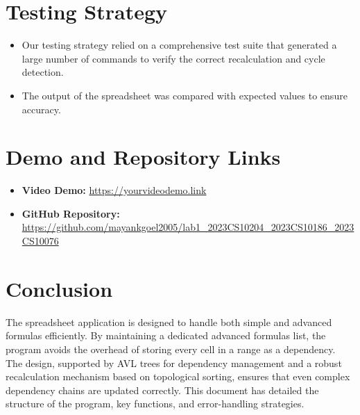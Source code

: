 \documentclass[12pt]{article}
\begin{document}
\section{Testing Strategy}
\begin{itemize}[noitemsep]
    \item Our testing strategy relied on a comprehensive test suite that generated a large number of commands to verify the correct recalculation and cycle detection.
    \item The output of the spreadsheet was compared with expected values to ensure accuracy.
\end{itemize}

\section{Demo and Repository Links}
\begin{itemize}[noitemsep]
    \item \textbf{Video Demo:} \url{https://yourvideodemo.link}
    \item \textbf{GitHub Repository:} \url{https://github.com/mayankgoel2005/lab1_2023CS10204_2023CS10186_2023CS10076}
\end{itemize}

\section{Conclusion}
The spreadsheet application is designed to handle both simple and advanced formulas efficiently. By maintaining a dedicated advanced formulas list, the program avoids the overhead of storing every cell in a range as a dependency. The design, supported by AVL trees for dependency management and a robust recalculation mechanism based on topological sorting, ensures that even complex dependency chains are updated correctly. This document has detailed the structure of the program, key functions, and error-handling strategies.
\end{document}

